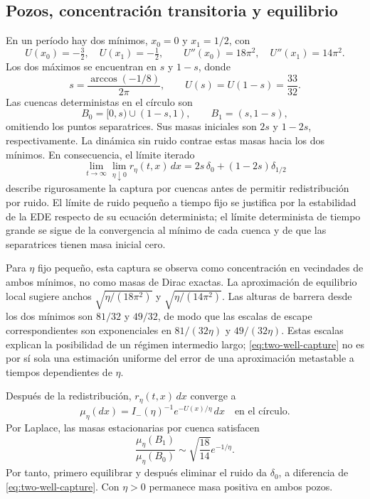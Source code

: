 \documentclass[11pt,a4paper]{article}
\theoremstyle{remark}\newtheorem{remark}{Observación}
\begin{document}
\subsection{Pozos, concentración transitoria y equilibrio}
En un período hay dos mínimos, $x_0=0$ y $x_1=1/2$, con
\[
 U(x_0)=-\tfrac32,\quad U(x_1)=-\tfrac12,
 \qquad U''(x_0)=18\pi^2,\quad U''(x_1)=14\pi^2.
\]
Los dos máximos se encuentran en $s$ y $1-s$, donde
\[
 s=\frac{\arccos(-1/8)}{2\pi},\qquad U(s)=U(1-s)=\frac{33}{32}.
\]
Las cuencas deterministas en el círculo son
\[
 B_0=[0,s)\cup(1-s,1),\qquad B_1=(s,1-s),
\]
omitiendo los puntos separatrices. Sus masas iniciales son $2s$ y $1-2s$, respectivamente. La dinámica sin ruido contrae estas masas hacia los dos mínimos. En consecuencia, el límite iterado
\begin{equation}\label{eq:two-well-capture}
 \lim_{t\to\infty}\lim_{\eta\downarrow0}
 r_\eta(t,x)\,dx
 =2s\,\delta_0+(1-2s)\delta_{1/2}
\end{equation}
describe rigurosamente la captura por cuencas antes de permitir redistribución por ruido. El límite de ruido pequeño a tiempo fijo se justifica por la estabilidad de la EDE respecto de su ecuación determinista; el límite determinista de tiempo grande se sigue de la convergencia al mínimo de cada cuenca y de que las separatrices tienen masa inicial cero.

Para $\eta$ fijo pequeño, esta captura se observa como concentración en vecindades de ambos mínimos, no como masas de Dirac exactas. La aproximación de equilibrio local sugiere anchos $\sqrt{\eta/(18\pi^2)}$ y $\sqrt{\eta/(14\pi^2)}$. Las alturas de barrera desde los dos mínimos son $81/32$ y $49/32$, de modo que las escalas de escape correspondientes son exponenciales en $81/(32\eta)$ y $49/(32\eta)$. Estas escalas explican la posibilidad de un régimen intermedio largo; \eqref{eq:two-well-capture} no es por sí sola una estimación uniforme del error de una aproximación metastable a tiempos dependientes de $\eta$.

Después de la redistribución, $r_\eta(t,x)\,dx$ converge a
\[
 \mu_\eta(dx)=I_-(\eta)^{-1}e^{-U(x)/\eta}\,dx
 \quad\text{en el círculo}.
\]
Por Laplace, las masas estacionarias por cuenca satisfacen
\[
 \frac{\mu_\eta(B_1)}{\mu_\eta(B_0)}
 \sim\sqrt{\frac{18}{14}}e^{-1/\eta}.
\]
Por tanto, primero equilibrar y después eliminar el ruido da $\delta_0$, a diferencia de \eqref{eq:two-well-capture}. Con $\eta>0$ permanece masa positiva en ambos pozos.
\end{document}
